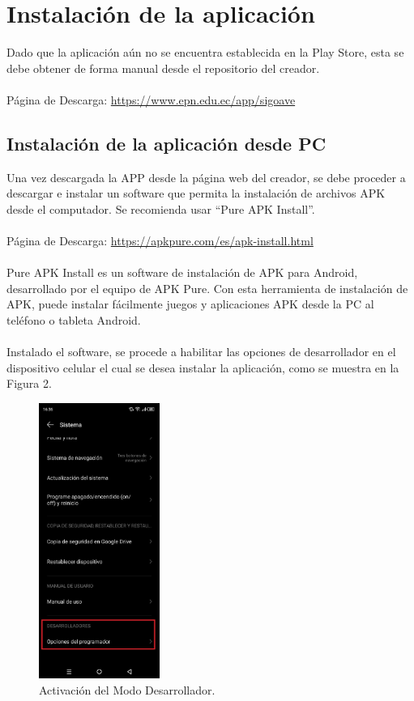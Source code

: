 \documentclass[a4paper,10pt, oneside, titlepage]{article}
\begin{document}
	\section{Instalación de la aplicación}
	Dado que la aplicación aún no se encuentra establecida en la Play Store, esta se debe obtener de forma manual desde el repositorio del creador.\\\\
	Página de Descarga: \textcolor{blue}{\url{https://www.epn.edu.ec/app/sigoave}}
	\subsection{Instalación de la aplicación desde PC}
	Una vez descargada la APP desde la página web del creador, se debe proceder a descargar e instalar un software que permita la instalación de archivos APK desde el computador. Se recomienda usar ``Pure APK Install''.\\\\
	Página de Descarga: \textcolor{blue}{\url{https://apkpure.com/es/apk-install.html}}\\\\
	Pure APK Install es un software de instalación de APK para Android, desarrollado por el equipo de APK Pure. Con esta herramienta de instalación de APK, puede instalar fácilmente juegos y aplicaciones APK desde la PC al teléfono o tableta Android.\\\\
	Instalado el software, se procede a habilitar las opciones de desarrollador en el dispositivo celular el cual se desea instalar la aplicación, como se muestra en la Figura 2.
	\begin{figure}[!h]
		\centering
		\includegraphics[width = 0.45\linewidth, height = 9cm]{2.jpeg}
		\caption{Activación del Modo Desarrollador.}
	\end{figure}\\
\end{document}
